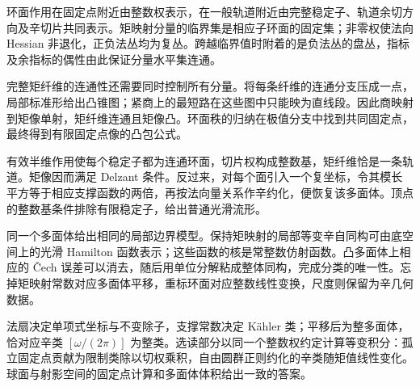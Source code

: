 \begin{chaptersummary}
环面作用在固定点附近由整数权表示，在一般轨道附近由完整稳定子、轨道余切方向及辛切片共同表示。矩映射分量的临界集是相应子环面的固定集；非零权使法向 Hessian 非退化，正负法丛均为复丛。跨越临界值时附着的是负法丛的盘丛，指标及余指标的偶性由此保证分量水平集连通。

\ProseParagraphBreak

完整矩纤维的连通性还需要同时控制所有分量。将每条纤维的连通分支压成一点，局部标准形给出凸锥图；紧商上的最短路在这些图中只能映为直线段。因此商映射到矩像单射，矩纤维连通且矩像凸。环面秩的归纳在极值分支中找到共同固定点，最终得到有限固定点像的凸包公式。

\ProseParagraphBreak

有效半维作用使每个稳定子都为连通环面，切片权构成整数基，矩纤维恰是一条轨道。矩像因而满足 Delzant 条件。反过来，对每个面引入一个复坐标，令其模长平方等于相应支撑函数的两倍，再按法向量关系作辛约化，便恢复该多面体。顶点的整数基条件排除有限稳定子，给出普通光滑流形。

\ProseParagraphBreak

同一个多面体给出相同的局部边界模型。保持矩映射的局部等变辛自同构可由底空间上的光滑 Hamilton 函数表示；这些函数的核是常整数仿射函数。凸多面体上相应的 Čech 误差可以消去，随后用单位分解粘成整体同构，完成分类的唯一性。忘掉矩映射常数对应多面体平移，重标环面对应整数线性变换，尺度则保留为辛几何数据。

\ProseParagraphBreak

法扇决定单项式坐标与不变除子，支撑常数决定 Kähler 类；平移后为整多面体，恰对应辛类 \([\omega/(2\pi)]\) 为整类。选读部分以同一个整数权约定计算等变积分：孤立固定点贡献为限制类除以切权乘积，自由圆群正则约化的辛类随矩值线性变化。球面与射影空间的固定点计算和多面体体积给出一致的答案。
\end{chaptersummary}

\BookExercises

